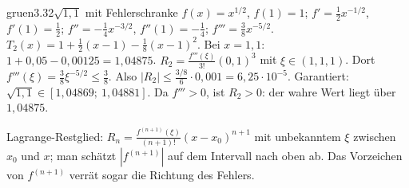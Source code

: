 \begin{loesungkarte}{gruen}{3.32}{$\sqrt{1{,}1}$ mit Fehlerschranke}
$f(x) = x^{1/2}$, $f(1) = 1$; $f' = \frac12x^{-1/2}$, $f'(1) = \frac12$; $f'' = -\frac14x^{-3/2}$, $f''(1) = -\frac14$; $f''' = \frac38x^{-5/2}$.
$T_2(x) = 1 + \frac12(x - 1) - \frac18(x - 1)^{2}$. Bei $x = 1{,}1$: $1 + 0{,}05 - 0{,}00125 = 1{,}04875$.
$R_2 = \frac{f'''(\xi)}{3!}(0{,}1)^{3}$ mit $\xi\in(1, 1{,}1)$. Dort $f'''(\xi) = \frac38\xi^{-5/2}\le\frac38$. Also $|R_2|\le\frac{3/8}6\cdot0{,}001 = 6{,}25\cdot10^{-5}$. Garantiert: $\sqrt{1{,}1}\in[1{,}04869;\ 1{,}04881]$. Da $f''' > 0$, ist $R_2 > 0$: der wahre Wert liegt über $1{,}04875$.
\begin{mitnehmen}\kastentext
Lagrange-Restglied: $R_n = \frac{f^{(n+1)}(\xi)}{(n + 1)!}(x - x_0)^{n+1}$ mit unbekanntem $\xi$ zwischen $x_0$ und $x$; man schätzt $|f^{(n+1)}|$ auf dem Intervall nach oben ab. Das Vorzeichen von $f^{(n+1)}$ verrät sogar die Richtung des Fehlers.
\end{mitnehmen}
\end{loesungkarte}

